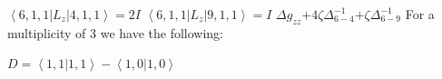 \documentclass[11pt]{article}
\begin{document}
\newline
$\left\langle6,1,1\left|L_{z}\right|4,1,1\right\rangle=2I$\newline
$\left\langle6,1,1\left|L_{z}\right|9,1,1\right\rangle=I$\newline
\newline$\Delta g_{zz}$\newline\newline$+4\zeta \Delta_{6-4}^{-1}$\newline$+\zeta \Delta_{6-9}^{-1}$\newline\newline
For a multiplicity of 3 we have the following:\newline

$D=\left\langle1,1|1,1\right\rangle-\left\langle1,0|1,0\right\rangle$\newline
\end{document}
